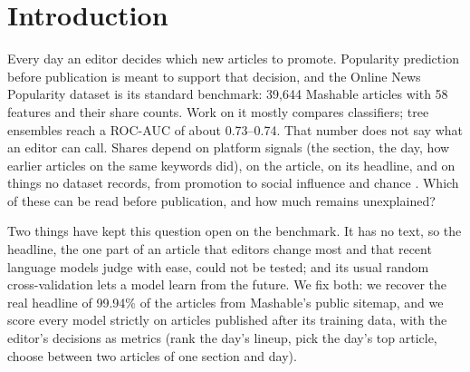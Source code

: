 \documentclass[10pt,a4paper,twocolumn]{article}
\begin{document}
\section{Introduction}
Every day an editor decides which new articles to promote. Popularity prediction before publication is meant to
support that decision, and the Online News Popularity dataset \citep{fernandes2015} is its standard benchmark:
39{,}644 Mashable articles with 58 features and their share counts. Work on it mostly compares classifiers;
tree ensembles reach a ROC-AUC of about 0.73--0.74. That number does not say what an editor can call. Shares
depend on platform signals (the section, the day, how earlier articles on the same keywords did), on the
article, on its headline, and on things no dataset records, from promotion to social influence and chance
\citep{salganik2006,martin2016,hofman2017}. Which of these can be read before publication, and how much remains
unexplained?

Two things have kept this question open on the benchmark. It has no text, so the headline, the one part of an
article that editors change most and that recent language models judge with ease, could not be tested; and
its usual random cross-validation lets a model learn from the future. We fix both: we recover the real headline of
99.94\% of the articles from Mashable's public sitemap, and we score every model strictly on articles published
after its training data, with the editor's decisions as metrics (rank the day's lineup, pick the day's top
article, choose between two articles of one section and day).
\end{document}
